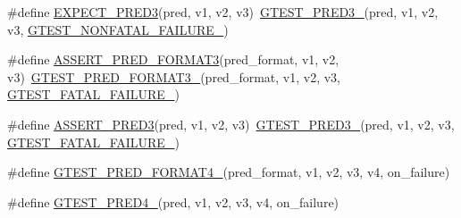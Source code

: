 \begin{DoxyCompactItemize}
\item 
\#define \mbox{\hyperlink{googletest-master_2googletest_2include_2gtest_2gtest__pred__impl_8h_a0a0aff2564ea84c7eb3517ac8eda04da}{E\+X\+P\+E\+C\+T\+\_\+\+P\+R\+E\+D3}}(pred,  v1,  v2,  v3)~\mbox{\hyperlink{_obj__test_2lib_2googletest-release-1_88_81_2googletest_2include_2gtest_2gtest__pred__impl_8h_af30518f03233bc4486b55284b0827eb8}{G\+T\+E\+S\+T\+\_\+\+P\+R\+E\+D3\+\_\+}}(pred, v1, v2, v3, \mbox{\hyperlink{_obj__test_2lib_2googletest-release-1_88_81_2googletest_2include_2gtest_2internal_2gtest-internal_8h_a6cb7482cfa03661a91c698eb5895f642}{G\+T\+E\+S\+T\+\_\+\+N\+O\+N\+F\+A\+T\+A\+L\+\_\+\+F\+A\+I\+L\+U\+R\+E\+\_\+}})
\item 
\#define \mbox{\hyperlink{googletest-master_2googletest_2include_2gtest_2gtest__pred__impl_8h_a494e3b8dc22f4765f7e041f16c930e3d}{A\+S\+S\+E\+R\+T\+\_\+\+P\+R\+E\+D\+\_\+\+F\+O\+R\+M\+A\+T3}}(pred\+\_\+format,  v1,  v2,  v3)~\mbox{\hyperlink{_obj__test_2lib_2googletest-release-1_88_81_2googletest_2include_2gtest_2gtest__pred__impl_8h_a49cdf8707268ee932bb772d879a226cc}{G\+T\+E\+S\+T\+\_\+\+P\+R\+E\+D\+\_\+\+F\+O\+R\+M\+A\+T3\+\_\+}}(pred\+\_\+format, v1, v2, v3, \mbox{\hyperlink{_obj__test_2lib_2googletest-release-1_88_81_2googletest_2include_2gtest_2internal_2gtest-internal_8h_a0f9a4c3ea82cc7bf4478eaffdc168358}{G\+T\+E\+S\+T\+\_\+\+F\+A\+T\+A\+L\+\_\+\+F\+A\+I\+L\+U\+R\+E\+\_\+}})
\item 
\#define \mbox{\hyperlink{googletest-master_2googletest_2include_2gtest_2gtest__pred__impl_8h_aa7688f3ab9f09a2c1dbf13bd1f29d8fd}{A\+S\+S\+E\+R\+T\+\_\+\+P\+R\+E\+D3}}(pred,  v1,  v2,  v3)~\mbox{\hyperlink{_obj__test_2lib_2googletest-release-1_88_81_2googletest_2include_2gtest_2gtest__pred__impl_8h_af30518f03233bc4486b55284b0827eb8}{G\+T\+E\+S\+T\+\_\+\+P\+R\+E\+D3\+\_\+}}(pred, v1, v2, v3, \mbox{\hyperlink{_obj__test_2lib_2googletest-release-1_88_81_2googletest_2include_2gtest_2internal_2gtest-internal_8h_a0f9a4c3ea82cc7bf4478eaffdc168358}{G\+T\+E\+S\+T\+\_\+\+F\+A\+T\+A\+L\+\_\+\+F\+A\+I\+L\+U\+R\+E\+\_\+}})
\item 
\#define \mbox{\hyperlink{googletest-master_2googletest_2include_2gtest_2gtest__pred__impl_8h_abd207ed869491ba4bba29f8df37b7355}{G\+T\+E\+S\+T\+\_\+\+P\+R\+E\+D\+\_\+\+F\+O\+R\+M\+A\+T4\+\_\+}}(pred\+\_\+format,  v1,  v2,  v3,  v4,  on\+\_\+failure)
\item 
\#define \mbox{\hyperlink{googletest-master_2googletest_2include_2gtest_2gtest__pred__impl_8h_a14e8c70455104fac032efec097ef668b}{G\+T\+E\+S\+T\+\_\+\+P\+R\+E\+D4\+\_\+}}(pred,  v1,  v2,  v3,  v4,  on\+\_\+failure)

\end{DoxyCompactItemize}
